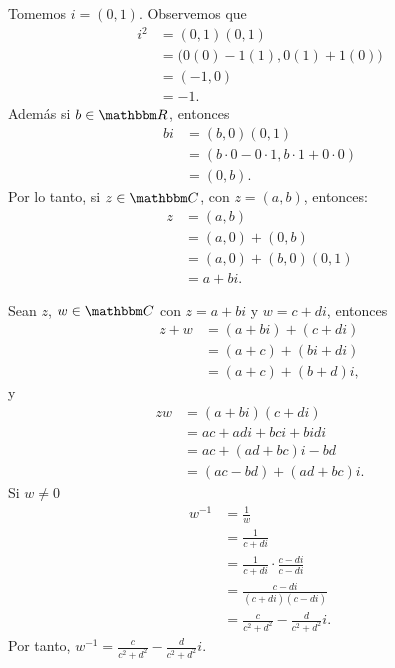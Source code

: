 \begin{observation}
    Tomemos $i=(0,1)$. Observemos que
    \begin{align*}
        i^2 &=(0,  1)(0,  1) \\
        &=\big( 0(0)-1(1),  0(1)+1(0)\big)\\
        &=(-1,  0)\\
        &=-1.
    \end{align*}
    Además si $b \in \RR$, entonces
    \begin{align*}
        b i & =(b,  0)(0,  1) \\
        & =(b \cdot 0-0 \cdot 1,  b \cdot 1+0 \cdot 0) \\
        & =(0,  b).
    \end{align*}
    Por lo tanto, si $z \in \CC$, con $z=(a,  b)$, entonces:
    \begin{align*}
        z &=(a,  b) \\
        & =(a,  0)+(0,  b) \\
        & =(a, 0)+(b, 0)(0,1) \\
        & =a+b i.
    \end{align*}
\end{observation}

\newpage

\begin{observation}
    Sean $z$, $w \in \CC$ con $z=a+bi$ y $w=c+di$, entonces
    \begin{align*}
        z+w &=(a+bi)+(c+di) \\
        &=(a+c)+(bi+di) \\
        &=(a+c)+(b+d)i,
    \end{align*}
    y
    \begin{align*}
        zw &=(a+bi)(c+di) \\
        &=ac+adi+bci+bidi \\
        &=ac+(ad+bc)i-bd \\
        &=(ac-bd)+(ad+bc)i.
    \end{align*}
    Si $w \neq 0$
    \begin{align*}
        w^{-1} &=\frac{1}{w} \\
        &=\frac{1}{c+di} \\
        &=\frac{1}{c+di} \cdot \frac{c-di}{c-di} \\
        &=\frac{c-di}{(c+di)(c-di)} \\
        &=\frac{c}{c^2+d^2} - \frac{d}{c^2+d^2} i.
    \end{align*}
    Por tanto, $\displaystyle w^{-1}=\frac{c}{c^2+d^2} - \frac{d}{c^2+d^2} i$.
\end{observation}

